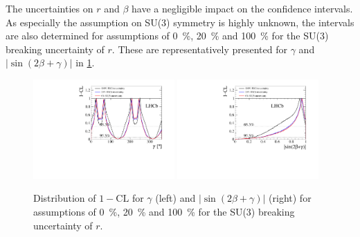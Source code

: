 The uncertainties on $r$ and $\beta$ have a negligible impact on the confidence intervals.
As especially the assumption on SU(3) symmetry is highly unknown, the intervals are also determined for assumptions of \SI{0}{\percent}, \SI{20}{\percent} and \SI{100}{\percent} for the SU(3) breaking uncertainty of $r$.
These are representatively presented for $\gamma$ and $\left|\sin\!\left(2\beta+\gamma\right)\right|$ in \cref{fig:SU3Scan}.
\begin{figure}[tbp]
    \centering
    \includegraphics[width=0.48\textwidth]{11Result/figs/su3_scan_bd2dpi_g.pdf}
    \includegraphics[width=0.48\textwidth]{11Result/figs/su3_scan_sin2b_plus_gamma.pdf}
    \caption{Distribution of $1-\text{CL}$ for $\gamma$ (left) and $\left|\sin\!\left(2\beta+\gamma\right)\right|$ (right) for assumptions of \SI{0}{\percent}, \SI{20}{\percent} and \SI{100}{\percent} for the SU(3) breaking uncertainty of $r$.}
    \label{fig:SU3Scan}
\end{figure}
